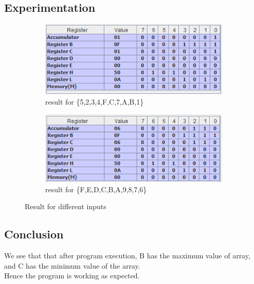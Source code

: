 \documentclass[a4paper]{article} %
\begin{document}
    \subsection{Experimentation}
        \begin{figure}[h!]
            \centering
            \begin{subfigure}[b]{0.4\linewidth}
                \centering
                \includegraphics[width=\linewidth]{Assignment 1/2_min-max-10-elem/test 1.png}
                \caption{result for \{5,2,3,4,F,C,7,A,B,1\}}
                \label{fg2a}
            \end{subfigure}
            \begin{subfigure}[b]{0.4\linewidth}
                \centering
                \includegraphics[width=\linewidth]{Assignment 1/2_min-max-10-elem/test 2.png}
                \caption{result for \{F,E,D,C,B,A,9,8,7,6\}}
                \label{fg2b}
            \end{subfigure}
            \caption{Result for different inputs}
            \label{fg2}
        \end{figure}
    \subsection{Conclusion}
        We see that that after program execution, B has the maximum value of array, and C has the minimum value of the array.\\
        Hence the program is working as expected.
\newpage
\end{document}
